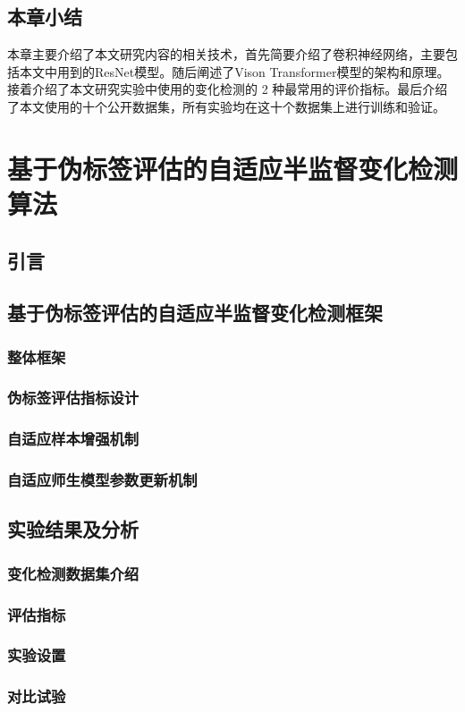 \documentclass[lang=chs, degree=master, blindreview=false, adobe=false]{yanputhesis}
\begin{document}
\section{本章小结}
本章主要介绍了本文研究内容的相关技术，首先简要介绍了卷积神经网络，主要包括本文中用到的ResNet模型。随后阐述了Vison Transformer模型的架构和原理。接着介绍了本文研究实验中使用的变化检测的 2 种最常用的评价指标。最后介绍了本文使用的十个公开数据集，所有实验均在这十个数据集上进行训练和验证。
\chapter{基于伪标签评估的自适应半监督变化检测算法}
\section{引言}
\section{基于伪标签评估的自适应半监督变化检测框架}
\subsection{整体框架}
\subsection{伪标签评估指标设计}
\subsection{自适应样本增强机制}
\subsection{自适应师生模型参数更新机制}
\section{实验结果及分析}
\subsection{变化检测数据集介绍}
\subsection{评估指标}
\subsection{实验设置}
\subsection{对比试验}
\end{document}
